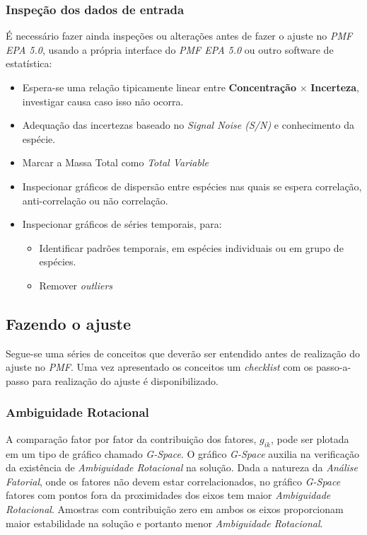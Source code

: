 \subsubsection{Inspeção dos dados de entrada}
É necessário fazer ainda inspeções ou alterações antes de fazer o ajuste no \textit{PMF EPA 5.0}, usando a própria interface do \textit{PMF EPA 5.0} ou outro software de estatística: 
\begin{itemize}
  \item Espera-se uma relação tipicamente linear entre \textbf{Concentração} $\times$ \textbf{Incerteza}, investigar causa caso isso não ocorra. 
  \item Adequação das incertezas baseado no \textit{Signal Noise (S/N)} e conhecimento da espécie. 
  \item Marcar a Massa Total como \textit{Total Variable}
  \item Inspecionar gráficos de dispersão entre espécies nas quais se espera correlação, anti-correlação ou não correlação. 
  \item Inspecionar gráficos de séries temporais, para:
  \begin{itemize}
    \item Identificar padrões temporais, em espécies individuais ou em grupo de espécies.
    \item Remover \textit{outliers} 
  \end{itemize}
\end{itemize}

\subsection{Fazendo o ajuste}
Segue-se uma séries de conceitos que deverão ser entendido antes de realização do ajuste no \textit{PMF}. Uma vez apresentado os conceitos um \textit{checklist} com os passo-a-passo para realização do ajuste é disponibilizado. 
 
\subsubsection{Ambiguidade Rotacional}
A comparação fator por fator da contribuição dos fatores, $g_{ik}$, pode ser plotada em um tipo de gráfico chamado \textit{G-Space}. O gráfico \textit{G-Space} auxilia na verificação da existência de \textit{Ambiguidade Rotacional} na solução. Dada a natureza da \textit{Análise Fatorial}, onde os fatores não devem estar correlacionados, no gráfico \textit{G-Space} fatores com pontos fora da proximidades dos eixos tem maior \textit{Ambiguidade Rotacional}. Amostras com contribuição zero em ambos os eixos proporcionam maior estabilidade na solução e portanto menor \textit{Ambiguidade Rotacional}. 

